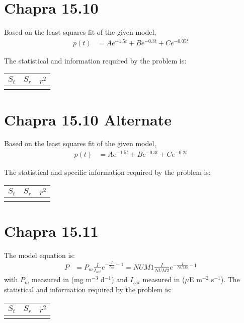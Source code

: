 \documentclass{article}
\begin{document}
\section{Chapra 15.10}
Based on the least squares fit of the given model,
\begin{align*} %
p(t)&=Ae^{-1.5t} + Be^{-0.3t} + Ce^{-0.05t}
\end{align*}

The statistical and information required by the problem is:
\begin{center}
\begin{tabular}{c|c|c}
$S_t$ & $S_r$ & $r^2$\\ \hline
 & & \\
\end{tabular}
\end{center}

\section{Chapra 15.10 Alternate}
Based on the least squares fit of the given model,
\begin{align*}%
p(t)&=Ae^{-1.5t} + Be^{-0.3t} + Ce^{-0.2t}
\end{align*}

The statistical and specific information required by the problem is:
\begin{center}
\begin{tabular}{c|c|c}
$S_t$ & $S_r$ & $r^2$\\ \hline
 & & \\
\end{tabular}
\end{center}

\section{Chapra 15.11}
The model equation is:
\begin{align*} %
P&=P_m\frac{I}{I_{sat}}e^{-\frac{I}{I_{sat}}-1}=
NUM1\frac{I}{NUM2}e^{-\frac{I}{NUM3}-1}
\end{align*}
with $P_m$ measured in (mg m$^{-3}$ d$^{-1}$) and $I_{sat}$ measured
in ($\mu$E m$^{-2}$ s$^{-1}$).
The statistical and information required by the problem is:
\begin{center}
\begin{tabular}{c|c|c}
$S_t$ & $S_r$ & $r^2$\\ \hline
 & & \\
\end{tabular}
\end{center}
 
\end{document}
